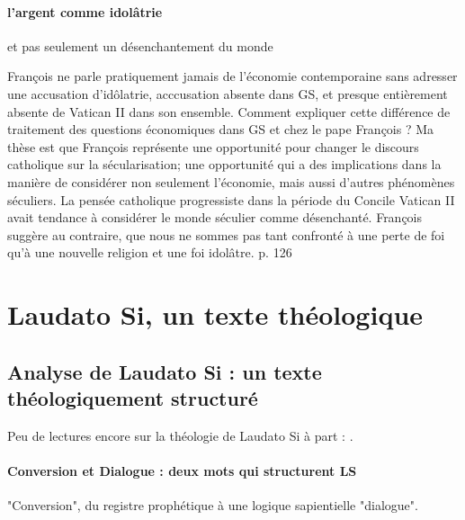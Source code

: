 \paragraph{l'argent comme idolâtrie }et pas seulement un désenchantement du monde

\begin{singlequote}
   François ne parle pratiquement jamais de l’économie contemporaine sans adresser une accusation d’idôlatrie, acccusation absente dans GS, et presque entièrement absente de Vatican II dans son ensemble.
Comment expliquer cette différence de traitement des questions économiques dans GS et chez le pape François ?
Ma thèse est que François représente une opportunité pour changer le discours catholique sur la sécularisation; une opportunité qui a des implications dans la manière de considérer non seulement l’économie, mais aussi d’autres phénomènes séculiers.
La pensée catholique progressiste dans la période du Concile Vatican II avait tendance à considérer le monde séculier comme désenchanté. François suggère au contraire, que nous ne sommes pas tant confronté à une perte de foi qu’à une nouvelle religion et une foi idolâtre. \cite{cavanaugh_idolatrie_2022} p. 126
  
\end{singlequote}



 



\section{Laudato Si, un texte théologique}

\subsection{Analyse de Laudato Si : un texte théologiquement structuré}

Peu de lectures encore sur la théologie de Laudato Si à part :  \cite{goujon_laudato_2022}.

 

\paragraph{Conversion et Dialogue : deux mots qui structurent LS}  "Conversion", du registre prophétique  à une logique sapientielle "dialogue". 

